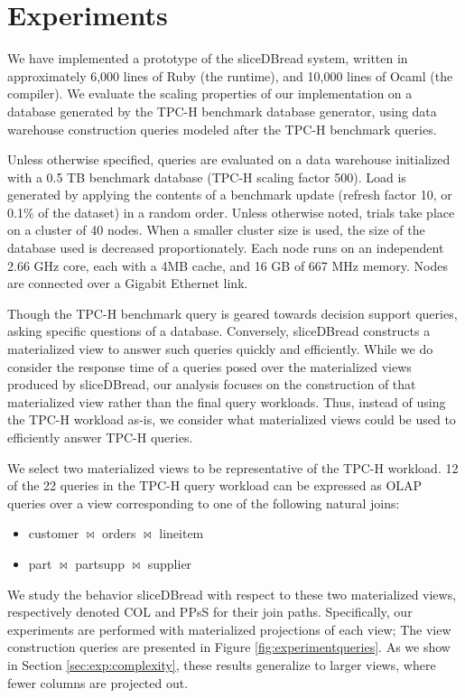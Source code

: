 
\section{Experiments}
\label{sec:experiments}

We have implemented a prototype of the sliceDBread system, written in approximately 6,000 lines of Ruby (the runtime), and 10,000 lines of Ocaml (the compiler).  We evaluate the scaling properties of our implementation on a database generated by the TPC-H benchmark database generator, using data warehouse construction queries modeled after the TPC-H benchmark queries.  

Unless otherwise specified, queries are evaluated on a data warehouse initialized with a 0.5 TB benchmark database (TPC-H scaling factor 500).  Load is generated by applying the contents of a benchmark update (refresh factor 10, or 0.1\% of the dataset) in a random order.  Unless otherwise noted, trials take place on a cluster of 40 nodes.  When a smaller cluster size is used, the size of the database used is decreased proportionately.  Each node runs on an independent 2.66 GHz core, each with a 4MB cache, and 16 GB of 667 MHz memory.  Nodes are connected over a Gigabit Ethernet link. 

Though the TPC-H benchmark query is geared towards decision support queries, asking specific questions of a database.  Conversely, sliceDBread constructs a materialized view to answer such queries quickly and efficiently.  While we do consider the response time of a queries posed over the materialized views produced by sliceDBread, our analysis focuses on the construction of that materialized view rather than the final query workloads.  Thus, instead of using the TPC-H workload as-is, we consider what materialized views could be used to efficiently answer TPC-H queries.

We select two materialized views to be representative of the TPC-H workload.  12 of the 22 queries in the TPC-H query workload can be expressed as OLAP queries over a view corresponding to one of the following natural joins:
\begin{itemize}
\item customer $\bowtie$ orders $\bowtie$ lineitem
\item part $\bowtie$ partsupp $\bowtie$ supplier
\end{itemize}
We study the behavior sliceDBread with respect to these two materialized views, respectively denoted COL and PPsS for their join paths.  Specifically, our experiments are performed with materialized projections of each view; The view construction queries are presented in Figure \ref{fig:experimentqueries}.  As we show in Section \ref{sec:exp:complexity}, these results generalize to larger views, where fewer columns are projected out.

